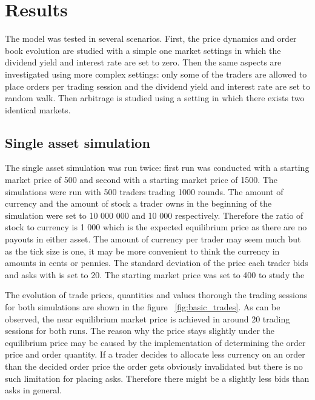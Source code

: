 
\section{Results}

The model was tested in several scenarios. First, the price 
dynamics and order book evolution are studied with a simple one market settings in which the dividend
yield and interest rate are set to zero. Then the same aspects are investigated
using more complex settings: only some of the traders are allowed to place orders
per trading session and the dividend yield and interest rate are set to random walk.
Then arbitrage is studied using 
a setting in which there exists two identical markets.


\subsection{Single asset simulation}
The single asset simulation was run twice: first run
was conducted with a starting market price of 500 and second
with a starting market price of 1500. The simulations were
run with 500 traders trading 1000 rounds. The 
amount of currency and the amount of stock 
a trader owns in the beginning of the simulation were set to
10 000 000 and 10 000 respectively. Therefore
the ratio of stock to currency is 1 000 which
is the expected equilibrium price as there are
no payouts in either asset. The amount of currency
per trader may seem much but as the tick size is one,
it may be more convenient to think the currency in amounts
in cents or pennies. The standard deviation of
the price each trader bids and asks with is set to 20. The 
starting market price was set to 400 to study the 

The evolution of trade prices, quantities and values thorough
the trading sessions for both simulations are shown in the figure
~\ref{fig:basic_trades}. As can be observed,
the near equilibrium market price is achieved in around 20 trading
sessions for both runs. The reason why the price stays slightly 
under the equilibrium price may be caused by the implementation of
determining the order price and order quantity. If a trader decides
to allocate less currency on an order than the decided order price 
the order gets obviously invalidated but there is no such
limitation for placing asks. Therefore there might be a slightly less
bids than asks in general. 

